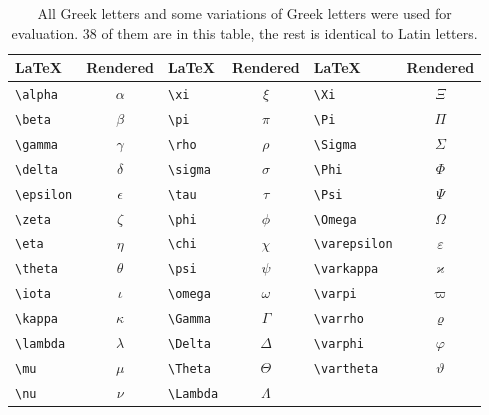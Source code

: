 \begin{table}[ht]
        \centering

            \begin{tabular}{lc|lc|lc}
                \toprule
                \LaTeX & Rendered & \LaTeX & Rendered & \LaTeX & Rendered \\
                \midrule
\verb+\alpha+ & $\alpha$ &\verb+\xi+ & $\xi$ &\verb+\Xi+ & $\Xi$\\
\verb+\beta+ & $\beta$ &\verb+\pi+ & $\pi$ &\verb+\Pi+ & $\Pi$\\
\verb+\gamma+ & $\gamma$ &\verb+\rho+ & $\rho$ &\verb+\Sigma+ & $\Sigma$\\
\verb+\delta+ & $\delta$ &\verb+\sigma+ & $\sigma$ &\verb+\Phi+ & $\Phi$\\
\verb+\epsilon+ & $\epsilon$ &\verb+\tau+ & $\tau$ &\verb+\Psi+ & $\Psi$\\
\verb+\zeta+ & $\zeta$ &\verb+\phi+ & $\phi$ &\verb+\Omega+ & $\Omega$\\
\verb+\eta+ & $\eta$ &\verb+\chi+ & $\chi$ &\verb+\varepsilon+ & $\varepsilon$\\
\verb+\theta+ & $\theta$ &\verb+\psi+ & $\psi$ &\verb+\varkappa+ & $\varkappa$\\
\verb+\iota+ & $\iota$ &\verb+\omega+ & $\omega$ &\verb+\varpi+ & $\varpi$\\
\verb+\kappa+ & $\kappa$ &\verb+\Gamma+ & $\Gamma$ &\verb+\varrho+ & $\varrho$\\
\verb+\lambda+ & $\lambda$ &\verb+\Delta+ & $\Delta$ &\verb+\varphi+ & $\varphi$\\
\verb+\mu+ & $\mu$ &\verb+\Theta+ & $\Theta$ &\verb+\vartheta+ & $\vartheta$\\
\verb+\nu+ & $\nu$ &\verb+\Lambda+ & $\Lambda$ &\verb+ + & $ $\\

        \bottomrule
    \end{tabular}

    \caption{All Greek letters and some variations of Greek letters were
             used for evaluation. 38 of them are in this table, the rest
             is identical to Latin letters.}
    \label{table:symbols-of-db-4}
\end{table}


